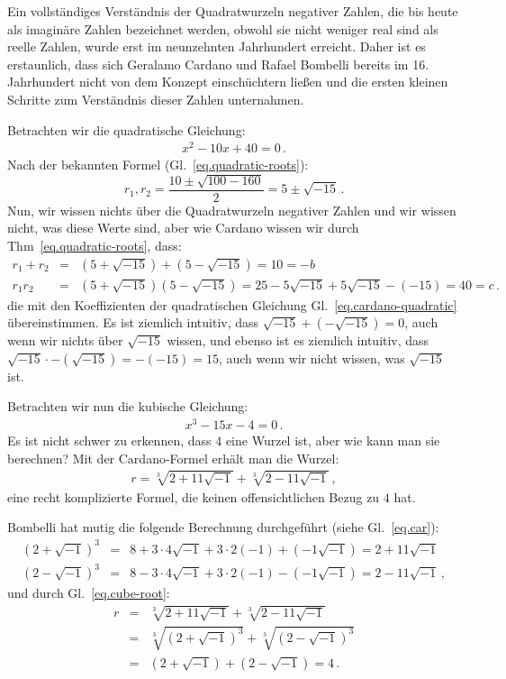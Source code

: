 Ein vollständiges Verständnis der Quadratwurzeln negativer Zahlen, die bis heute als imaginäre Zahlen bezeichnet werden, obwohl sie nicht weniger real sind als reelle Zahlen, wurde erst im neunzehnten Jahrhundert erreicht. Daher ist es erstaunlich, dass sich Geralamo Cardano und Rafael Bombelli bereits im 16. Jahrhundert nicht von dem Konzept einschüchtern ließen und die ersten kleinen Schritte zum Verständnis dieser Zahlen unternahmen.

Betrachten wir die quadratische Gleichung:
\begin{align}
x^2-10x+40=0\,.\label{eq.cardano-quadratic}
\end{align}
Nach der bekannten Formel (Gl.~\ref{eq.quadratic-roots}):
\[
r_1, r_2=\displaystyle\frac{10\pm\sqrt{100-160}}{2}=5\pm\sqrt{-15}\,.
\]
Nun, wir wissen nichts über die Quadratwurzeln negativer Zahlen und wir wissen nicht, was diese Werte sind, aber wie Cardano wissen wir durch Thm~\ref{eq.quadratic-roots}, dass:
\[
\begin{array}{lcl}
r_1+r_2&=&(5+\sqrt{-15})+(5-\sqrt{-15})=10=-b\\
r_1r_2&=&(5+\sqrt{-15})(5-\sqrt{-15})=25-5\sqrt{-15}+5\sqrt{-15}-(-15)=40=c\,.
\end{array}
\]
die mit den Koeffizienten der quadratischen Gleichung Gl.~\ref{eq.cardano-quadratic} übereinstimmen. Es ist ziemlich intuitiv, dass $\sqrt{-15}+(-\sqrt{-15})=0$, auch wenn wir nichts über $\sqrt{-15}$ wissen, und ebenso ist es ziemlich intuitiv, dass $\sqrt{-15}\cdot-(\sqrt{-15})=-(-15)=15$, auch wenn wir nicht wissen, was $\sqrt{-15}$ ist.

Betrachten wir nun die kubische Gleichung:
\begin{align}
x^3-15x-4=0\,.\label{eq.bombelli-cubic}
\end{align}
Es ist nicht schwer zu erkennen, dass $4$ eine Wurzel ist, aber wie kann man sie berechnen? Mit der Cardano-Formel erhält man die Wurzel:
\begin{align}
r=\sqrt[3]{2+11\sqrt{-1}}+\sqrt[3]{2-11\sqrt{-1}}\,,\label{eq.cube-root}
\end{align}
eine recht komplizierte Formel, die keinen offensichtlichen Bezug zu $4$ hat. 

Bombelli hat mutig die folgende Berechnung durchgeführt (siehe Gl.~\ref{eq.car}):
\begin{eqnarray*}
(2+\sqrt{-1})^3&=&
8+3\cdot 4\sqrt{-1}+3\cdot 2(-1)+(-1\sqrt{-1})=
2+11\sqrt{-1}\\
(2-\sqrt{-1})^3&=&
8-3\cdot 4\sqrt{-1}+3\cdot 2(-1)-(-1\sqrt{-1})=
2-11\sqrt{-1}\,,
\end{eqnarray*}
und durch Gl.~\ref{eq.cube-root}:
\begin{eqnarray*}
r&=&\sqrt[3]{2+11\sqrt{-1}} + \sqrt[3]{2-11\sqrt{-1}}\\
&=&\sqrt[3]{(2+\sqrt{-1})^3} + \sqrt[3]{(2-\sqrt{-1})^3}\\
&=&(2+\sqrt{-1}) + (2-\sqrt{-1})=4\,.
\end{eqnarray*}

